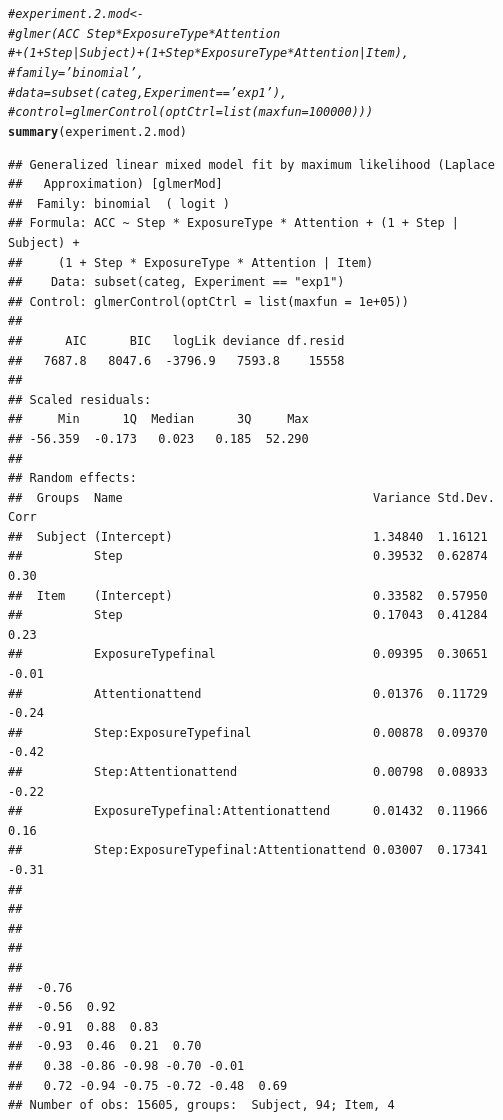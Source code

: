 \documentclass[11pt]{article}\usepackage[]{graphicx}\usepackage[]{color}
\makeatletter
\newcommand{\hlcom}[1]{\textcolor[rgb]{0.678,0.584,0.686}{\textit{#1}}}%
\newcommand{\hlstd}[1]{\textcolor[rgb]{0.345,0.345,0.345}{#1}}%
\newcommand{\hlkwd}[1]{\textcolor[rgb]{0.737,0.353,0.396}{\textbf{#1}}}%
\newenvironment{kframe}{%
 \def\at@end@of@kframe{}%
 \ifinner\ifhmode%
  \def\at@end@of@kframe{\end{minipage}}%
  \begin{minipage}{\columnwidth}%
 \fi\fi%
 \def\FrameCommand##1{\hskip\@totalleftmargin \hskip-\fboxsep
 \colorbox{shadecolor}{##1}\hskip-\fboxsep
     \hskip-\linewidth \hskip-\@totalleftmargin \hskip\columnwidth}%
 \MakeFramed {\advance\hsize-\width
   \@totalleftmargin\z@ \linewidth\hsize
   \@setminipage}}%
 {\par\unskip\endMakeFramed%
 \at@end@of@kframe}
\newenvironment{knitrout}{}{} %
\makeatother
\begin{document}
\begin{knitrout}\footnotesize
{}\color{fgcolor}\begin{kframe}
\begin{alltt}
 \hlcom{#experiment.2.mod <-}
 \hlcom{#glmer(ACC ~ Step*ExposureType*Attention}
 \hlcom{#+ (1 + Step|Subject) + (1+Step*ExposureType*Attention|Item),}
 \hlcom{#family='binomial',}
 \hlcom{#data = subset(categ, Experiment == 'exp1'),}
 \hlcom{#control = glmerControl(optCtrl = list(maxfun = 100000)))}
 \hlkwd{summary}\hlstd{(experiment.2.mod)}
\end{alltt}
\begin{verbatim}
## Generalized linear mixed model fit by maximum likelihood (Laplace
##   Approximation) [glmerMod]
##  Family: binomial  ( logit )
## Formula: ACC ~ Step * ExposureType * Attention + (1 + Step | Subject) +  
##     (1 + Step * ExposureType * Attention | Item)
##    Data: subset(categ, Experiment == "exp1")
## Control: glmerControl(optCtrl = list(maxfun = 1e+05))
## 
##      AIC      BIC   logLik deviance df.resid 
##   7687.8   8047.6  -3796.9   7593.8    15558 
## 
## Scaled residuals: 
##     Min      1Q  Median      3Q     Max 
## -56.359  -0.173   0.023   0.185  52.290 
## 
## Random effects:
##  Groups  Name                                   Variance Std.Dev. Corr 
##  Subject (Intercept)                            1.34840  1.16121       
##          Step                                   0.39532  0.62874  0.30 
##  Item    (Intercept)                            0.33582  0.57950       
##          Step                                   0.17043  0.41284   0.23
##          ExposureTypefinal                      0.09395  0.30651  -0.01
##          Attentionattend                        0.01376  0.11729  -0.24
##          Step:ExposureTypefinal                 0.00878  0.09370  -0.42
##          Step:Attentionattend                   0.00798  0.08933  -0.22
##          ExposureTypefinal:Attentionattend      0.01432  0.11966   0.16
##          Step:ExposureTypefinal:Attentionattend 0.03007  0.17341  -0.31
##                                     
##                                     
##                                     
##                                     
##                                     
##  -0.76                              
##  -0.56  0.92                        
##  -0.91  0.88  0.83                  
##  -0.93  0.46  0.21  0.70            
##   0.38 -0.86 -0.98 -0.70 -0.01      
##   0.72 -0.94 -0.75 -0.72 -0.48  0.69
## Number of obs: 15605, groups:  Subject, 94; Item, 4

\end{verbatim}
\end{kframe}
\end{knitrout}
\end{document}
